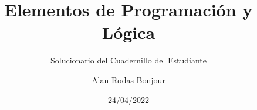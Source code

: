 \documentclass[11pt,fleqn]{book} %
\begin{document}

\title{Elementos de Programación y Lógica}
\subtitle{Solucionario del Cuadernillo del Estudiante}
\author{Alan Rodas Bonjour}
\date{24/04/2022}


\maketitle





\setlength{\parskip}{0.5em}

%

\end{document}

